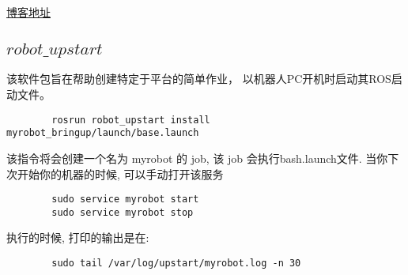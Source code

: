 \href{https://blog.csdn.net/jiangsala/article/details/88796261}{博客地址} \par
    \subsection{$robot\_upstart$}
    该软件包旨在帮助创建特定于平台的简单作业，
    以机器人PC开机时启动其ROS启动文件。
    \begin{lstlisting}
        rosrun robot_upstart install myrobot_bringup/launch/base.launch
    \end{lstlisting}
    该指令将会创建一个名为 myrobot 的 job, 该 job 会执行bash.launch文件. 当你下次开始你的机器的时候, 可以手动打开该服务
    \begin{lstlisting}
        sudo service myrobot start
        sudo service myrobot stop
    \end{lstlisting}
    执行的时候, 打印的输出是在:
    \begin{lstlisting}
        sudo tail /var/log/upstart/myrobot.log -n 30
    \end{lstlisting}
